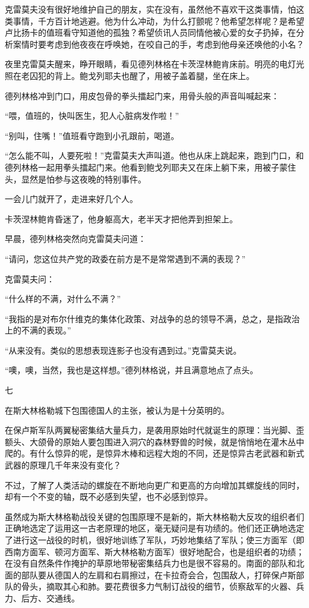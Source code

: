 克雷莫夫没有很好地维护自己的朋友，实在没有，虽然他不喜欢干这类事情，怕这类事情，千方百计地逃避。他为什么冲动，为什么打颤呢？他希望怎样呢？是希望卢比扬卡的值班看守知道他的孤独？希望侦讯人员同情他被心爱的女子扔掉，在分析案情时要考虑到他夜夜在呼唤她，在咬自己的手，考虑到他母亲还唤他的小名？

夜里克雷莫夫醒来，睁开眼睛，看见德列林格在卡茨涅林鲍肯床前。明亮的电灯光照在老囚犯的背上。鲍戈列耶夫也醒了，用被子盖着腿，坐在床上。

德列林格冲到门口，用皮包骨的拳头擂起门来，用骨头般的声音叫喊起来：

“喂，值班的，快叫医生，犯人心脏病发作啦！”

“别叫，住嘴！”值班看守跑到小孔跟前，喝道。

“怎么能不叫，人要死啦！”克雷莫夫大声叫道。他也从床上跳起来，跑到门口，和德列林格一起用拳头擂起门来。他看到鲍戈列耶夫又在床上躺下来，用被子蒙住头，显然是怕参与这夜晚的特别事件。

一会儿门就开了，走进来好几个人。

卡茨涅林鲍肯昏迷了，他身躯高大，老半天才把他弄到担架上。

早晨，德列林格突然向克雷莫夫问道：

“请问，您这位共产党的政委在前方是不是常常遇到不满的表现？”

克雷莫夫问：

“什么样的不满，对什么不满？”

“我指的是对布尔什维克的集体化政策、对战争的总的领导不满，总之，是指政治上的不满的表现。”

“从来没有。类似的思想表现连影子也没有遇到过。”克雷莫夫说。

“噢，噢，当然，我也是这样想。”德列林格说，并且满意地点了点头。

七

在斯大林格勒城下包围德国人的主张，被认为是十分英明的。

在保卢斯军队两翼秘密集结大量兵力，是袭用原始时代就诞生的原理：当光脚、歪额头、大颌骨的原始人要包围进入洞穴的森林野兽的时候，就是悄悄地在灌木丛中爬的。有什么惊异的呢，是惊异木棒和远程大炮的不同，还是惊异古老武器和新式武器的原理几千年来没有变化？

不过，了解了人类活动的螺旋在不断地向更广和更高的方向增加其螺旋线的同时，却有一个不变的轴，既不必感到失望，也不必感到惊异。

虽然成为斯大林格勒战役关键的包围原理不是新的，斯大林格勒大反攻的组织者们正确地选定了运用这一古老原理的地区，毫无疑问是有功绩的。他们还正确地选定了进行这一战役的时机，很好地训练了军队，巧妙地集结了军队；使三方面军（即西南方面军、顿河方面军、斯大林格勒方面军）很好地配合，也是组织者的功绩；在没有自然条件作掩护的草原地带秘密集结兵力也是很不容易的。南面的部队和北面的部队要从德国人的左肩和右肩擦过，在卡拉奇会合，包围敌人，打碎保卢斯部队的骨头，摘取其心和肺。要花费很多力气制订战役的细节，侦察敌军的火器、兵力、后方、交通线。


